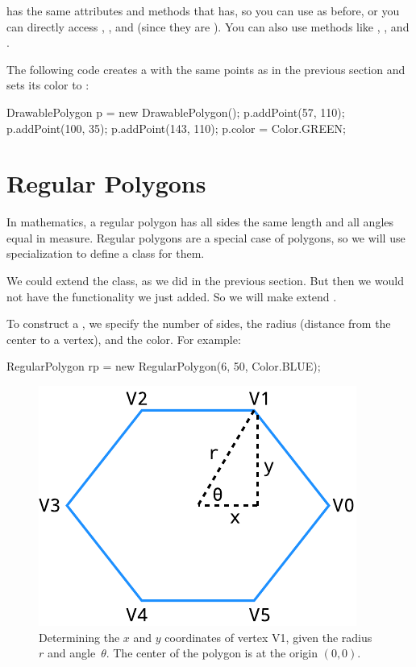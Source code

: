  has the same attributes and methods that  has, so you can use  as before, or you can directly access , , and  (since they are ).
You can also use methods like , , and .

The following code creates a  with the same points as in the previous section and sets its color to :

\begin{code}
DrawablePolygon p = new DrawablePolygon();
p.addPoint(57, 110);
p.addPoint(100, 35);
p.addPoint(143, 110);
p.color = Color.GREEN;
\end{code}


\section{Regular Polygons}

In mathematics, a regular polygon has all sides the same length and all angles equal in measure.
Regular polygons are a special case of polygons, so we will use specialization to define a class for them.

We could extend the  class, as we did in the previous section.
But then we would not have the  functionality we just added.
So we will make  extend .

To construct a , we specify the number of sides, the radius (distance from the center to a vertex), and the color.
For example:

\begin{code}
RegularPolygon rp = new RegularPolygon(6, 50, Color.BLUE);
\end{code}

\begin{figure}[!ht]
\begin{center}
\includegraphics{figs/hexagon.pdf}
\caption{Determining the $x$ and $y$ coordinates of vertex V1, given the radius~$r$ and angle~$\theta$.
The center of the polygon is at the origin $(0, 0)$.}
\label{fig:hexagon}
\end{center}
\end{figure}

